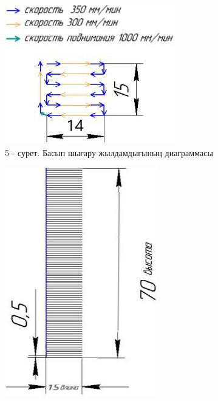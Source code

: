 \begin{figure}[H]
    \centering
    \begin{subfigure}[t]{0.45\textwidth}
        \centering
        \includegraphics[width=\textwidth]{media/ict2/image191}
        \caption*{5 - сурет. Басып шығару жылдамдығының диаграммасы}
    \end{subfigure}
    \begin{subfigure}[t]{0.45\textwidth}
        \centering
        \includegraphics[width=\textwidth]{media/ict2/image192}

\end{subfigure}
\end{figure}
